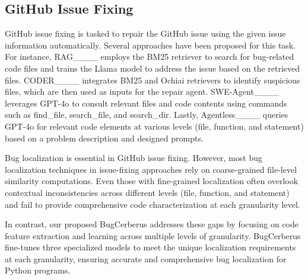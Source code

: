 \subsection{GitHub Issue Fixing}
GitHub issue fixing is tasked to repair the GitHub issue using the given issue information automatically. Several approaches have been proposed for this task. For instance, RAG____ employs the BM25 retriever to search for bug-related code files and trains the Llama model to address the issue based on the retrieved files. 
CODER____ integrates BM25 and Ochiai retrievers to identify suspicious files, which are then used as inputs for the repair agent. 
SWE-Agent____ leverages GPT-4o to consult relevant files and code contents using commands such as find\_file, search\_file, and search\_dir. 
Lastly, Agentless____ queries GPT-4o for relevant code elements at various levels (file, function, and statement) based on a problem description and designed prompts.

Bug localization is essential in GitHub issue fixing. However, most bug localization techniques in issue-fixing approaches rely on coarse-grained file-level similarity computations. Even those with fine-grained localization often overlook contextual inconsistencies across different levels (file, function, and statement) and fail to provide comprehensive code characterization at each granularity level.

In contrast, our proposed BugCerberus addresses these gaps by focusing on code feature extraction and learning across multiple levels of granularity. BugCerberus fine-tunes three specialized models to meet the unique localization requirements at each granularity, ensuring accurate and comprehensive bug localization for Python programs.